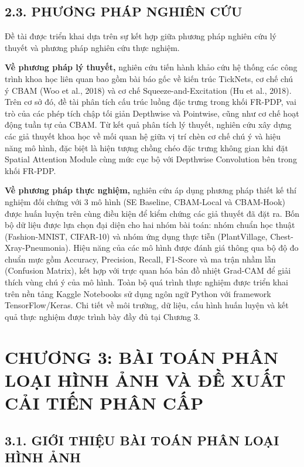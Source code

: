 \documentclass[
]{article}
\begin{document}
\subsection{2.3. PHƯƠNG PHÁP NGHIÊN CỨU}\label{phuong-phap-nghien-cuu}

Đề tài được triển khai dựa trên sự kết hợp giữa phương pháp nghiên cứu lý thuyết và phương pháp nghiên cứu thực nghiệm.

\textbf{Về phương pháp lý thuyết,} nghiên cứu tiến hành khảo cứu hệ thống các công trình khoa học liên quan bao gồm bài báo gốc về kiến trúc TickNets, cơ chế chú ý CBAM (Woo et al., 2018) và cơ chế Squeeze-and-Excitation (Hu et al., 2018). Trên cơ sở đó, đề tài phân tích cấu trúc luồng đặc trưng trong khối FR-PDP, vai trò của các phép tích chập tối giản Depthwise và Pointwise, cũng như cơ chế hoạt động tuần tự của CBAM. Từ kết quả phân tích lý thuyết, nghiên cứu xây dựng các giả thuyết khoa học về mối quan hệ giữa vị trí chèn cơ chế chú ý và hiệu năng mô hình, đặc biệt là hiện tượng chồng chéo đặc trưng không gian khi đặt Spatial Attention Module cùng mức cục bộ với Depthwise Convolution bên trong khối FR-PDP.

\textbf{Về phương pháp thực nghiệm,} nghiên cứu áp dụng phương pháp thiết kế thí nghiệm đối chứng với 3 mô hình (SE Baseline, CBAM-Local và CBAM-Hook) được huấn luyện trên cùng điều kiện để kiểm chứng các giả thuyết đã đặt ra. Bốn bộ dữ liệu được lựa chọn đại diện cho hai nhóm bài toán: nhóm chuẩn học thuật (Fashion-MNIST, CIFAR-10) và nhóm ứng dụng thực tiễn (PlantVillage, Chest-Xray-Pneumonia). Hiệu năng của các mô hình được đánh giá thông qua bộ độ đo chuẩn mực gồm Accuracy, Precision, Recall, F1-Score và ma trận nhầm lẫn (Confusion Matrix), kết hợp với trực quan hóa bản đồ nhiệt Grad-CAM để giải thích vùng chú ý của mô hình. Toàn bộ quá trình thực nghiệm được triển khai trên nền tảng Kaggle Notebooks sử dụng ngôn ngữ Python với framework TensorFlow/Keras. Chi tiết về môi trường, dữ liệu, cấu hình huấn luyện và kết quả thực nghiệm được trình bày đầy đủ tại Chương 3.

\section{CHƯƠNG 3: BÀI TOÁN PHÂN LOẠI HÌNH ẢNH VÀ ĐỀ XUẤT CẢI TIẾN PHÂN CẤP}\label{chux1b0ux1a1ng-3}

\subsection{3.1. GIỚI THIỆU BÀI TOÁN PHÂN LOẠI HÌNH ẢNH}\label{gioi-thieu-bai-toan}
\end{document}
